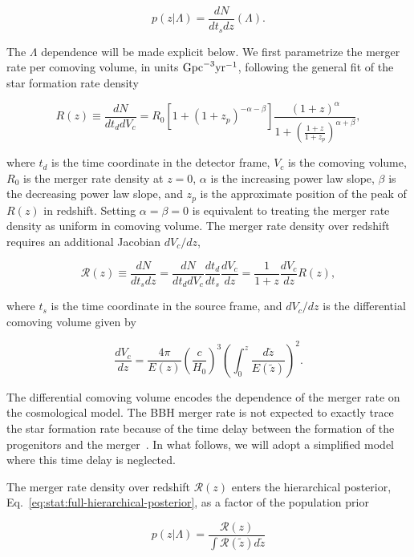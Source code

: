 \documentclass[%
preprint,
nofootinbib,
 amsmath,amssymb,
 aps,
]{revtex4-2}
\newcommand{\given}[2]{p( #1 | #2 )}
\newcommand{\be}{\begin{equation}}
\newcommand{\ee}{\end{equation}}
\newcommand{\pa}[1]{\left(#1\right)}
\begin{document}
\be
\given{z}{\Lambda} = \frac{dN}{dt_s dz}(\Lambda).
\ee

The $\Lambda$ dependence will be made explicit below. We first parametrize the merger rate per
comoving volume, in units $\rm{Gpc}^{-3} \rm{yr}^{-1}$, following the general fit of the star
formation rate density~\cite{Madau:2014bja}

\begin{equation}
	R(z) \equiv \frac{dN}{dt_d dV_c} = R_0 [1 + (1 + z_p)^{-\alpha -\beta}]\frac{(1 + z)^{\alpha}}{1 + \left ( \frac{1 + z}{1 + z_p} \right)^{\alpha + \beta}},
\end{equation}

where $t_d$ is the time coordinate in the detector frame, $V_c$ is the comoving volume, $R_0$ is
the merger rate density at $z=0$, $\alpha$ is the increasing power law slope, $\beta$ is the
decreasing power law slope, and $z_p$ is the approximate position of the peak of $R(z)$ in
redshift. Setting $\alpha = \beta = 0$ is equivalent to treating the merger rate density as uniform
in comoving volume. The merger rate density over redshift requires an additional Jacobian
$dV_c/dz$,

\begin{equation}
	\mathcal{R}(z) \equiv \frac{dN}{dt_s dz} = \frac{dN}{dt_d dV_c} \frac{dt_d}{dt_s} \frac{dV_c}{dz} = \frac{1}{1 + z} \frac{dV_c}{dz} R(z),
\end{equation}

where $t_s$ is the time coordinate in the source frame, and $dV_c /dz$ is the differential comoving
volume given by

\begin{equation}
	\frac{dV_c}{dz} =  \frac{4 \pi }{E(z)}\pa{\frac{c}{H_0}}^3 \pa{\int_0^z \frac{d\tilde{z}}{E(\tilde{z})}}^2.
\end{equation}

The differential comoving volume encodes the dependence of the merger rate on the cosmological
model. The BBH merger rate is not expected to exactly trace the star formation rate because of the
time delay between the formation of the progenitors and the
merger~\cite{santoliquido_cosmic_2020,fishbach_time_2021,van_son_redshift_2022}. In what follows,
we will adopt a simplified model where this time delay is neglected.

The merger rate density over redshift $\mathcal{R}(z)$ enters the hierarchical posterior,
Eq.~\eqref{eq:stat:full-hierarchical-posterior}, as a factor of the population prior

\begin{equation}
	\given{z}{\Lambda} = \frac{\mathcal{R}(z)}{\int \mathcal{R}(\tilde{z}) d\tilde{z}}
\end{equation}
\end{document}
